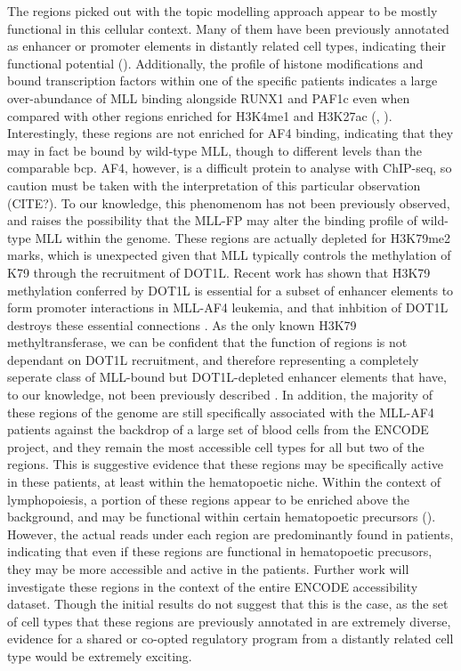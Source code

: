 The regions picked out with the topic modelling approach appear to be mostly functional in this cellular context. Many of them have been previously annotated as enhancer or promoter elements in distantly related cell types, indicating their functional potential (). Additionally, the profile of histone modifications and bound transcription factors within one of the specific patients indicates a large over-abundance of MLL binding alongside RUNX1 and PAF1c even when compared with other regions enriched for H3K4me1 and H3K27ac (, ). Interestingly, these regions are not enriched for AF4 binding, indicating that they may in fact be bound by wild-type MLL, though to different levels than the comparable \gls{bcp}. AF4, however, is a difficult protein to analyse with ChIP-seq, so caution must be taken with the interpretation of this particular observation (CITE?). To our knowledge, this phenomenom has not been previously observed, and raises the possibility that the MLL-FP may alter the binding profile of wild-type MLL within the genome. These regions are actually depleted for H3K79me2 marks, which is unexpected given that MLL typically controls the methylation of K79 through the recruitment of DOT1L. Recent work has shown that H3K79 methylation conferred by DOT1L is essential for a subset of enhancer elements to form promoter interactions in MLL-AF4 leukemia, and that inhbition of DOT1L destroys these essential connections \cite{Godfrey2019}. As the only known H3K79 methyltransferase, we can be confident that the function of regions is not dependant on DOT1L recruitment, and therefore representing a completely seperate class of MLL-bound but DOT1L-depleted enhancer elements that have, to our knowledge, not been previously described \cite{Q2002}. In addition, the majority of these regions of the genome are still specifically associated with the MLL-AF4 patients against the backdrop of a large set of blood cells from the ENCODE project, and they remain the most accessible cell types for all but two of the regions. This is suggestive evidence that these regions may be specifically active in these patients, at least within the hematopoetic niche. Within the context of lymphopoiesis, a portion of these regions appear to be enriched above the background, and may be functional within certain hematopoetic precursors (). However, the actual reads under each region are predominantly found in patients, indicating that even if these regions are functional in hematopoetic precusors, they may be more accessible and active in the patients. Further work will investigate these regions in the context of the entire ENCODE accessibility dataset. Though the initial results do not suggest that this is the case, as the set of cell types that these regions are previously annotated in are extremely diverse, evidence for a shared or co-opted regulatory program from a distantly related cell type would be extremely exciting. 

